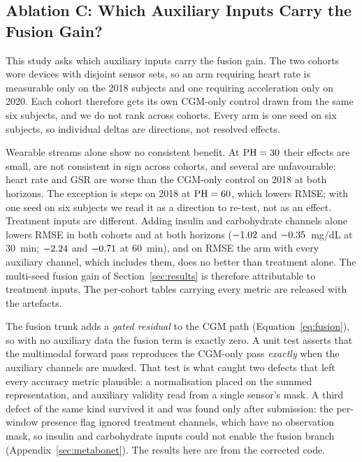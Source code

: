 \subsection{Ablation C: Which Auxiliary Inputs Carry the Fusion Gain?}
\label{sec:ablation_c}



This study asks which auxiliary inputs carry the fusion gain. The two cohorts
wore devices with disjoint sensor sets, so an arm requiring heart rate is
measurable only on the 2018 subjects and one requiring acceleration only on
2020. Each cohort therefore gets its own CGM-only control drawn from the same six
subjects, and we do not rank across cohorts. Every arm is one seed on six
subjects, so individual deltas are directions, not resolved effects.

Wearable streams alone show no consistent benefit. At $\mathrm{PH} = 30$ their effects
are small, are not consistent in sign across cohorts, and
several are unfavourable: heart rate and GSR are worse than the CGM-only control
on 2018 at both horizons. The exception is steps on 2018 at $\mathrm{PH} = 60$, which
lowers RMSE; with one seed on six subjects we read it as a direction to re-test,
not as an effect. Treatment inputs are different. Adding insulin and carbohydrate
channels alone lowers RMSE in both cohorts and at both horizons
($-1.02$ and $-0.35$~mg/dL at
30~min; $-2.24$ and $-0.71$ at
60~min), and on RMSE the arm with every auxiliary channel, which includes them, does no
better than treatment alone. The multi-seed fusion gain of
Section~\ref{sec:results} is therefore attributable to treatment inputs. The
per-cohort tables carrying every metric are released with the artefacts.

The fusion trunk adds a \emph{gated residual} to the CGM path
(Equation~\ref{eq:fusion}), so with no auxiliary data the fusion term is exactly
zero. A unit test asserts that the multimodal forward pass reproduces the
CGM-only pass \emph{exactly} when the auxiliary channels are masked. That test is
what caught two defects that left every accuracy metric plausible: a
normalisation placed on the summed representation, and auxiliary validity read
from a single sensor's mask. A third defect of the same kind survived it and was
found only after submission: the per-window presence flag ignored treatment
channels, which have no observation mask, so insulin and carbohydrate inputs
could not enable the fusion branch (Appendix~\ref{sec:metabonet}). The results
here are from the corrected code.

